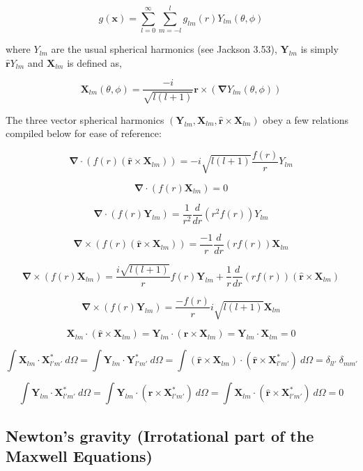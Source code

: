 \documentclass {article}
\renewcommand\vec{\mathbf}
\let\OldS\nabla
\renewcommand{\nabla}{\boldsymbol{\OldS}}
\let\OldHat\hat
\renewcommand{\hat}[1]{\OldHat{\mathbf{#1}}}
\begin{document}
$$g(\vec x) = \sum_{l=0}^{\infty} \sum_{m=-l}^{l} g_{lm}(r) Y_{lm}(\theta, \phi)$$

where $Y_{lm}$ are the usual spherical harmonics (see Jackson 3.53), $\vec Y_{lm}$ is simply $\hat r Y_{lm}$  and $\vec X_{lm}$ is defined as,

$$\vec X_{lm}(\theta, \phi) = \frac {-i}{\sqrt{l(l+1)}} \vec r \times \left( \nabla Y_{lm}(\theta, \phi) \right) $$

The three vector spherical harmonics $(\vec Y_{lm}, \vec X_{lm}, \hat r \times \vec X_{lm} )$ obey a few relations compiled below for ease of reference:

$$\nabla  \cdot \left( f(r) \left( \hat r \times \vec X_{lm} \right) \right) = - i \sqrt {l(l+1)} \frac {f(r)} {r} Y_{lm}$$

$$\nabla \cdot \left( f(r) \vec X_{lm} \right) = 0 $$

$$ \nabla \cdot \left( f(r) \vec Y_{lm} \right) = \frac {1}{r^2} \frac d {dr} \left(r^2 f(r) \right) Y_{lm}$$

$$\nabla \times \left( f(r) \left( \hat r \times \vec X_{lm} \right) \right) = \frac {-1} {r} \frac d {dr} \left( r f(r) \right) \vec X_{lm}$$

$$\nabla \times \left( f(r) \vec X_{lm} \right) = \frac {i \sqrt{l(l+1)} } {r} f(r) \vec Y_{lm} + \frac 1 r \frac d {dr} \left( r f(r) \right) \left( \hat r \times \vec X_{lm} \right)$$

$$\nabla \times \left( f(r) \vec Y_{lm} \right) = \frac {- f(r)} r i \sqrt {l (l+1)} \vec X_{lm}$$

$$ \vec X_{lm} \cdot ( \hat r \times \vec X_{lm}) = \vec Y_{lm} \cdot  ( \hat r \times \vec X_{lm}) = \vec Y_{lm} \cdot \vec X_{lm} = 0$$ 

$$ \int \vec X_{lm} \cdot \vec X_{l' m'}^* ~ d \Omega  = \int \vec Y_{lm} \cdot \vec Y_{l' m'}^* ~ d \Omega  = \int ( \hat r \times \vec X_{lm}) \cdot ( \hat r \times \vec X_{l' m'}^*) ~ d \Omega  = \delta_{ll'} ~ \delta_{m m'} $$

$$\int \vec Y_{lm} \cdot \vec X_{l' m'}^* ~ d \Omega = \int \vec Y_{lm} \cdot ( \hat r \times \vec X_{l' m'}^* ) ~ d \Omega  =  \int \vec X_{lm} \cdot ( \hat r \times \vec X_{l' m'}^* ) ~ d \Omega   = 0 $$

\newpage
\subsection{Newton's gravity (Irrotational part of the Maxwell Equations)}
\end{document}
